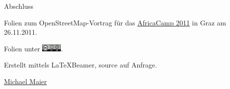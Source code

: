 \documentclass{beamer}
\begin{document}
\begin{frame}{Abschluss}

Folien zum OpenStreetMap-Vortrag für das \href{http://afrikacamp-graz.at}{AfricaCamp 2011} in Graz am 26.11.2011.
\vspace{1cm}

Folien unter \includegraphics[width=1cm]{cc-by-sa.png}.
\vspace{1cm}

Erstellt mittels \LaTeX Beamer, source auf Anfrage.
\vspace{1cm}

\href{mailto:michael.maier@student.tugraz.at}{Michael Maier}
\end{frame}
\end{document}
